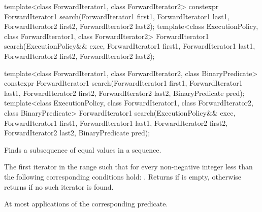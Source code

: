 %
\begin{itemdecl}
template<class ForwardIterator1, class ForwardIterator2>
  constexpr ForwardIterator1
    search(ForwardIterator1 first1, ForwardIterator1 last1,
           ForwardIterator2 first2, ForwardIterator2 last2);
template<class ExecutionPolicy, class ForwardIterator1, class ForwardIterator2>
  ForwardIterator1
    search(ExecutionPolicy&& exec,
           ForwardIterator1 first1, ForwardIterator1 last1,
           ForwardIterator2 first2, ForwardIterator2 last2);

template<class ForwardIterator1, class ForwardIterator2,
         class BinaryPredicate>
  constexpr ForwardIterator1
    search(ForwardIterator1 first1, ForwardIterator1 last1,
           ForwardIterator2 first2, ForwardIterator2 last2,
           BinaryPredicate pred);
template<class ExecutionPolicy, class ForwardIterator1, class ForwardIterator2,
         class BinaryPredicate>
  ForwardIterator1
    search(ExecutionPolicy&& exec,
           ForwardIterator1 first1, ForwardIterator1 last1,
           ForwardIterator2 first2, ForwardIterator2 last2,
           BinaryPredicate pred);
\end{itemdecl}

\begin{itemdescr}
\pnum
\effects
Finds a subsequence of equal values in a sequence.

\pnum
\returns
The first iterator
in the range 
such that for every non-negative integer
less than
the following corresponding conditions hold:
.
Returns 
if  is empty,
otherwise returns 
if no such iterator is found.

\pnum
\complexity
At most
applications of the corresponding predicate.
\end{itemdescr}

